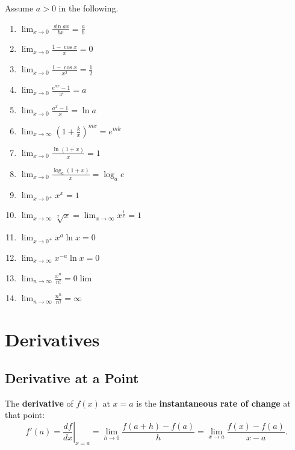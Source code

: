 \documentclass[a4paper,11pt]{article}
\begin{document}
\begin{tcolorbox}
    Assume $a > 0$ in the following.
    \begin{multicols}{2}
        \begin{enumerate}
            \item $\lim_{x \to 0} \frac{\sin ax}{bx} = \frac{a}{b}$
            \item $\lim_{x \to 0} \frac{1 - \cos x}{x} = 0$
            \item $\lim_{x \to 0} \frac{1 - \cos x}{x^2} = \frac{1}{2}$
            \item $\lim_{x \to 0} \frac{e^{ax} - 1}{x} = a$
            \item $\lim_{x \to 0} \frac{a^x - 1}{x} = \ln a$
            \item $\lim_{x \to \infty} \left(1 + \frac{k}{x}\right)^{mx} = e^{mk}$
            \item $\lim_{x \to 0} \frac{\ln(1 + x)}{x} = 1$
            \item $\lim_{x \to 0} \frac{\log_a(1 + x)}{x} = \log_a e$
            \item $\lim_{x \to 0^+} x^x = 1$
            \item $\lim_{x \to \infty} \sqrt[x]{x} = \lim_{x \to \infty} x^{\frac{1}{x}} = 1$
            \item $\lim_{x \to 0^+} x^a \ln x = 0$
            \item $\lim_{x \to \infty} x^{-a} \ln x = 0$
            \item $\lim_{n \to \infty} \frac{x^n}{n!} = 0 \lim\limits$
            \item $\lim_{n \to \infty} \frac{n^n}{n!} = \infty$
        \end{enumerate}
    \end{multicols}
\end{tcolorbox}




\section{Derivatives}




\subsection{Derivative at a Point}

\begin{tcolorbox}
    The \textbf{derivative} of \( f(x) \) at \( x = a \) is the \textbf{instantaneous rate of change} at that point:
    \[
    f'(a) = \left. \frac{df}{dx} \right|_{x=a} =\lim\limits_{h \to 0} \frac{f(a + h) - f(a)}{h} = \lim\limits_{x \to a} \frac{f(x) - f(a)}{x - a}.
    \]
\end{tcolorbox}
\end{document}
